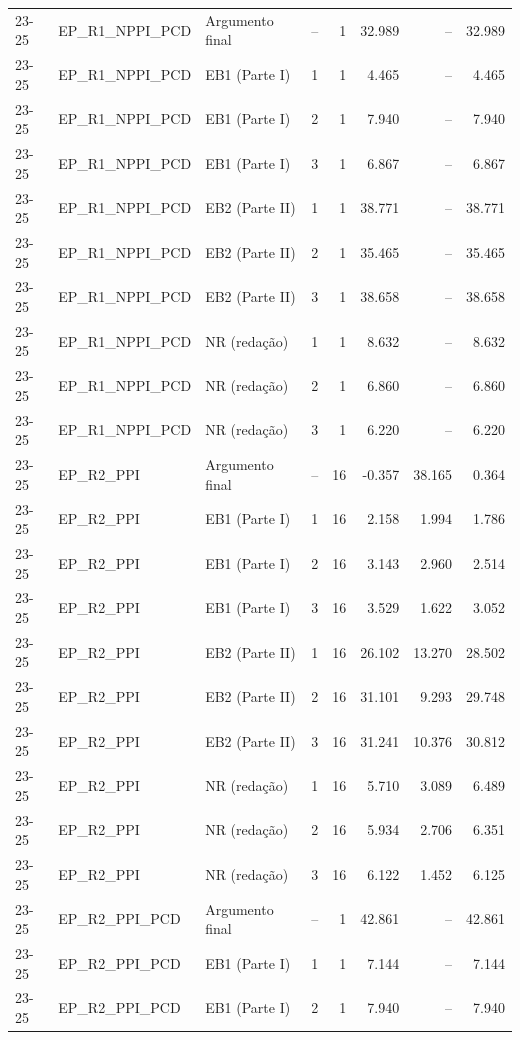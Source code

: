 \begin{longtable}{lllcrrrr}
23-25 & EP\_R1\_NPPI\_PCD & Argumento final & -- & 1 & 32.989 & -- & 32.989 \\
23-25 & EP\_R1\_NPPI\_PCD & EB1 (Parte I) & 1 & 1 & 4.465 & -- & 4.465 \\
23-25 & EP\_R1\_NPPI\_PCD & EB1 (Parte I) & 2 & 1 & 7.940 & -- & 7.940 \\
23-25 & EP\_R1\_NPPI\_PCD & EB1 (Parte I) & 3 & 1 & 6.867 & -- & 6.867 \\
23-25 & EP\_R1\_NPPI\_PCD & EB2 (Parte II) & 1 & 1 & 38.771 & -- & 38.771 \\
23-25 & EP\_R1\_NPPI\_PCD & EB2 (Parte II) & 2 & 1 & 35.465 & -- & 35.465 \\
23-25 & EP\_R1\_NPPI\_PCD & EB2 (Parte II) & 3 & 1 & 38.658 & -- & 38.658 \\
23-25 & EP\_R1\_NPPI\_PCD & NR (redação) & 1 & 1 & 8.632 & -- & 8.632 \\
23-25 & EP\_R1\_NPPI\_PCD & NR (redação) & 2 & 1 & 6.860 & -- & 6.860 \\
23-25 & EP\_R1\_NPPI\_PCD & NR (redação) & 3 & 1 & 6.220 & -- & 6.220 \\
23-25 & EP\_R2\_PPI & Argumento final & -- & 16 & -0.357 & 38.165 & 0.364 \\
23-25 & EP\_R2\_PPI & EB1 (Parte I) & 1 & 16 & 2.158 & 1.994 & 1.786 \\
23-25 & EP\_R2\_PPI & EB1 (Parte I) & 2 & 16 & 3.143 & 2.960 & 2.514 \\
23-25 & EP\_R2\_PPI & EB1 (Parte I) & 3 & 16 & 3.529 & 1.622 & 3.052 \\
23-25 & EP\_R2\_PPI & EB2 (Parte II) & 1 & 16 & 26.102 & 13.270 & 28.502 \\
23-25 & EP\_R2\_PPI & EB2 (Parte II) & 2 & 16 & 31.101 & 9.293 & 29.748 \\
23-25 & EP\_R2\_PPI & EB2 (Parte II) & 3 & 16 & 31.241 & 10.376 & 30.812 \\
23-25 & EP\_R2\_PPI & NR (redação) & 1 & 16 & 5.710 & 3.089 & 6.489 \\
23-25 & EP\_R2\_PPI & NR (redação) & 2 & 16 & 5.934 & 2.706 & 6.351 \\
23-25 & EP\_R2\_PPI & NR (redação) & 3 & 16 & 6.122 & 1.452 & 6.125 \\
23-25 & EP\_R2\_PPI\_PCD & Argumento final & -- & 1 & 42.861 & -- & 42.861 \\
23-25 & EP\_R2\_PPI\_PCD & EB1 (Parte I) & 1 & 1 & 7.144 & -- & 7.144 \\
23-25 & EP\_R2\_PPI\_PCD & EB1 (Parte I) & 2 & 1 & 7.940 & -- & 7.940 \\

\end{longtable}

